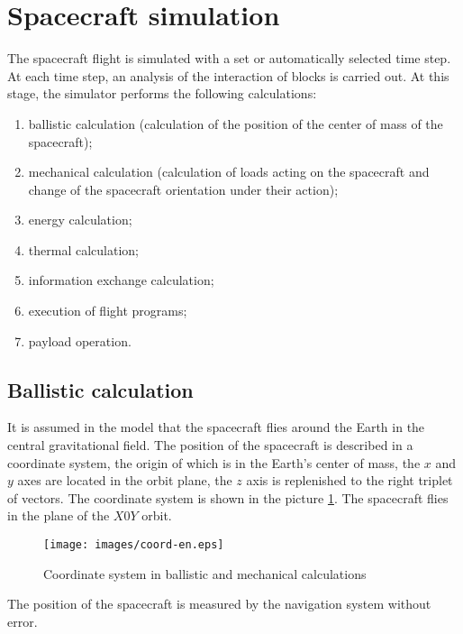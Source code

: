 \documentclass[12pt,a4paper]{article}
\begin{document}
\section{Spacecraft simulation}

The spacecraft flight is simulated with a set or automatically selected time step. At each time step, an analysis of the interaction of blocks is carried out. At this stage, the simulator performs the following calculations:

\begin{enumerate}
   \item ballistic calculation (calculation of the position of the center of mass of the spacecraft);
   \item mechanical calculation (calculation of loads acting on the spacecraft and change of the spacecraft orientation under their action);
   \item energy calculation;
   \item thermal calculation;
   \item information exchange calculation;
   \item execution of flight programs;
   \item payload operation.
\end{enumerate}

\subsection{Ballistic calculation}
\label{Sec:Ballistics}

It is assumed in the model that the spacecraft flies around the Earth in the central gravitational field. The position of the spacecraft is described in a coordinate system, the origin of which is in the Earth's center of mass, the $x$ and $y$ axes are located in the orbit plane, the $z$ axis is replenished to the right triplet of vectors. The coordinate system is shown in the picture \ref{Pic:Coord}. The spacecraft flies in the plane of the $X0Y$ orbit.

\begin{figure}[tbh]
  \begin{center}
    \texttt{[image: images/coord-en.eps]}
    \caption{Coordinate system in ballistic and mechanical calculations}
    \label{Pic:Coord}
  \end{center}
\end{figure}

The position of the spacecraft is measured by the navigation system without error.
\end{document}
